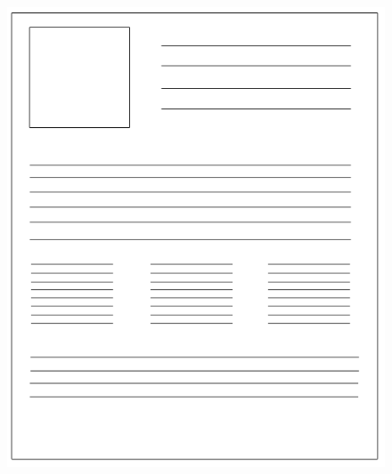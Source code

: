 \documentclass{beamer}
\begin{document}
\begin{frame}[fragile]
\begin{figure}[!tbp]
\begin{minipage}[b]{0.45\textwidth}
    \includegraphics[width=\textwidth]{images/page_complicated.png}
  \end{minipage}
\end{figure}

\end{frame}
\end{document}
